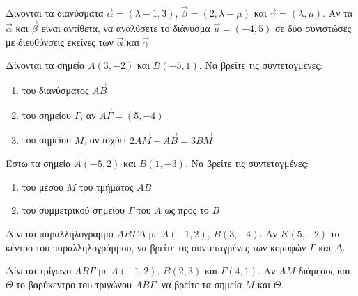 \documentclass[greek]{beamer}
\begin{document}
\begin{askisi}
  Δίνονται τα διανύσματα $\vec{α}=(λ-1,3)$, $\vec{β}=(2,λ-μ)$ και $\vec{γ}=(λ,μ)$. Αν τα $\vec{α}$ και $\vec{β}$ είναι αντίθετα, να αναλύσετε το διάνυσμα $\vec{u}=(-4,5)$ σε δύο συνιστώσες με διευθύνσεις εκείνες των $\vec{α}$ και $\vec{γ}$


\end{askisi}

\begin{askisi}
  Δίνονται τα σημεία $Α(3,-2)$ και $Β(-5,1)$. Να βρείτε τις συντεταγμένες:

  \begin{enumerate}
    \item<1-> του διανύσματος $\overrightarrow{ΑΒ}$
    \item<2-> του σημείου $Γ$, αν $\overrightarrow{ΑΓ}=(5,-4)$
    \item<3-> του σημείου $Μ$, αν ισχύει $2\overrightarrow{ΑΜ}-\overrightarrow{ΑΒ}=3\overrightarrow{ΒΜ}$
  \end{enumerate}


\end{askisi}

\begin{askisi}
  Έστω τα σημεία $Α(-5,2)$ και $Β(1,-3)$. Να βρείτε τις συντεταγμένες:
  \begin{enumerate}
    \item<1-> του μέσου $Μ$ του τμήματος $ΑΒ$
    \item<2-> του συμμετρικού σημείου $Γ$ του $Α$ ως προς το $Β$
  \end{enumerate}


\end{askisi}

\begin{askisi}

  Δίνεται παραλληλόγραμμο $ΑΒΓΔ$ με $Α(-1,2)$, $Β(3,-4)$. Αν $Κ(5,-2)$ το κέντρο του παραλληλογράμμου, να βρείτε τις συντεταγμένες των κορυφών $Γ$ και $Δ$.


\end{askisi}

\begin{askisi}
  Δίνεται τρίγωνο $ΑΒΓ$ με $Α(-1,2)$, $Β(2,3)$ και $Γ(4,1)$. Αν $ΑΜ$ διάμεσος και $Θ$ το βαρύκεντρο του τριγώνου $ΑΒΓ$, να βρείτε τα σημεία $Μ$ και $Θ$.

\end{askisi}
\end{document}
